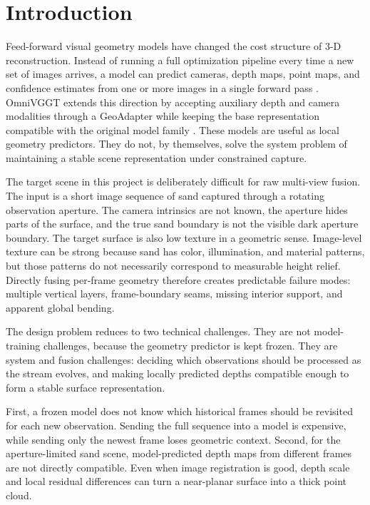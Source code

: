 \documentclass[conference]{IEEEtran}
\begin{document}
\section{Introduction}
Feed-forward visual geometry models have changed the cost structure of 3-D reconstruction. Instead of running a full optimization pipeline every time a new set of images arrives, a model can predict cameras, depth maps, point maps, and confidence estimates from one or more images in a single forward pass \cite{wang2025vggt}. OmniVGGT extends this direction by accepting auxiliary depth and camera modalities through a GeoAdapter while keeping the base representation compatible with the original model family \cite{peng2025omnivggt}. These models are useful as local geometry predictors. They do not, by themselves, solve the system problem of maintaining a stable scene representation under constrained capture.

The target scene in this project is deliberately difficult for raw multi-view fusion. The input is a short image sequence of sand captured through a rotating observation aperture. The camera intrinsics are not known, the aperture hides parts of the surface, and the true sand boundary is not the visible dark aperture boundary. The target surface is also low texture in a geometric sense. Image-level texture can be strong because sand has color, illumination, and material patterns, but those patterns do not necessarily correspond to measurable height relief. Directly fusing per-frame geometry therefore creates predictable failure modes: multiple vertical layers, frame-boundary seams, missing interior support, and apparent global bending.

The design problem reduces to two technical challenges. They are not model-training challenges, because the geometry predictor is kept frozen. They are system and fusion challenges: deciding which observations should be processed as the stream evolves, and making locally predicted depths compatible enough to form a stable surface representation.

First, a frozen model does not know which historical frames should be revisited for each new observation. Sending the full sequence into a model is expensive, while sending only the newest frame loses geometric context. Second, for the aperture-limited sand scene, model-predicted depth maps from different frames are not directly compatible. Even when image registration is good, depth scale and local residual differences can turn a near-planar surface into a thick point cloud.
\end{document}
